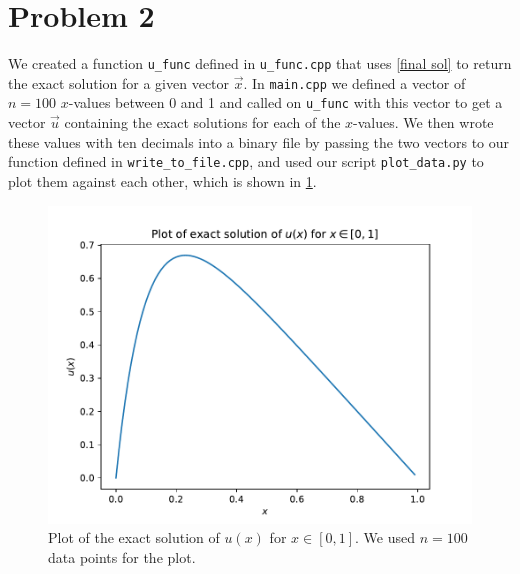 \documentclass[english,notitlepage]{revtex4-1}  %
\begin{document}
\section*{Problem 2}
We created a function \verb|u_func| defined in \verb|u_func.cpp| that uses \cref{final sol} to return the exact solution for a given vector $\vec{x}$. In \verb|main.cpp| we defined a vector of $n=100$  $x$-values between 0 and 1 and called on \verb|u_func| with this vector to get a vector $\vec{u}$ containing the exact solutions for each of the $x$-values. We then wrote these values with ten decimals into a binary file by passing the two vectors to our function defined in \verb|write_to_file.cpp|, and used our script \verb|plot_data.py| to plot them against each other, which is shown in \cref{plot_problem2}.
\begin{figure}[h!]
    \centering 
    \includegraphics[scale=0.80]{../data/exactSolution.pdf} %
    \caption{Plot of the exact solution of $u(x)$ for $x ∈ [0,1]$. We used $n =100$ data points for the plot.}
    \label{plot_problem2}
\end{figure}
\end{document}
